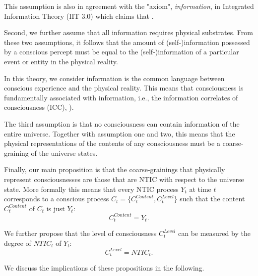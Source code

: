 \documentclass[utf8]{article}
\begin{document}
        This assumption is also in agreement with the "axiom", \textit{information}, in Integrated Information Theory (IIT 3.0) which claims that  \citep[p. 2]{oizumi2014phenomenology}.
        
        Second, we further assume that all information requires physical substrates. 
        From these two assumptions, it follows that the amount of (self-)information possessed by a conscious percept must be equal to the (self-)information of a particular event or entity in the physical reality. 
        
        In this theory, we consider information is the common language between conscious experience and the physical reality. This means that consciousness is fundamentally associated with information, i.e., the information correlates of consciousness (ICC), \cite{chalmers1996conscious, tononi2004information, gamez2011information, Gamez2016}).
        
        The third assumption is that no consciousness can contain information of the entire universe. Together with assumption one and two, this means that the physical representations of the contents of any consciousness must be a coarse-graining of the universe states. 
        
        Finally, our main proposition is that the coarse-grainings that physically represent consciousnesses are those that are NTIC with respect to the universe state. More formally this means that every NTIC process $Y_t$ at time $t$ corresponds to a conscious process $C_t=\{C_t^{Content},C_t^{Level}\}$ such that the content $C_{t}^{Content}$ of $C_t$ is just $Y_t$:
		\begin{equation}\label{eq:cContent}
			C_{t}^{Content} = Y_{t}.
		\end{equation}
		
		
		\noindent
        We further propose that the level of consciousness $C_{t}^{Level}$ can be measured by the degree of $NTIC_{t}$ of $Y_t$:
		\begin{equation}\label{eq:cLevel}
			C_{t}^{Level} = NTIC_{t}.
		\end{equation}
		\newline

		
		We discuss the implications of these propositions in the following. 	
		
		
\end{document}
